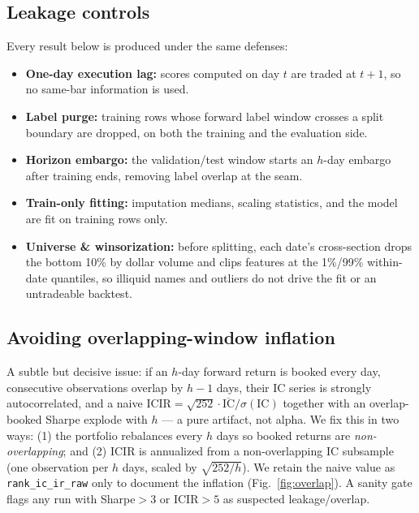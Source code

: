 \documentclass[9pt]{extarticle}
\begin{document}
\subsection{Leakage controls}
Every result below is produced under the same defenses:
\begin{itemize}
  \item \textbf{One-day execution lag:} scores computed on day $t$ are traded at
  $t{+}1$, so no same-bar information is used.
  \item \textbf{Label purge:} training rows whose forward label window crosses a
  split boundary are dropped, on both the training and the evaluation side.
  \item \textbf{Horizon embargo:} the validation/test window starts an
  $h$-day embargo after training ends, removing label overlap at the seam.
  \item \textbf{Train-only fitting:} imputation medians, scaling statistics, and
  the model are fit on training rows only.
  \item \textbf{Universe \& winsorization:} before splitting, each date's
  cross-section drops the bottom 10\% by dollar volume and clips features at the
  1\%/99\% within-date quantiles, so illiquid names and outliers do not drive the
  fit or an untradeable backtest.
\end{itemize}

\subsection{Avoiding overlapping-window inflation}
\label{sec:overlap}
A subtle but decisive issue: if an $h$-day forward return is booked every day,
consecutive observations overlap by $h{-}1$ days, their IC series is strongly
autocorrelated, and a naive
$\text{ICIR}=\sqrt{252}\cdot\overline{\text{IC}}/\sigma(\text{IC})$ together with
an overlap-booked Sharpe explode with $h$ --- a pure artifact, not alpha. We fix
this in two ways: (1) the portfolio rebalances every $h$ days so booked returns
are \emph{non-overlapping}; and (2) ICIR is annualized from a non-overlapping
IC subsample (one observation per $h$ days, scaled by $\sqrt{252/h}$). We retain
the naive value as \texttt{rank\_ic\_ir\_raw} only to document the inflation
(Fig.~\ref{fig:overlap}). A sanity gate flags any run with Sharpe$>3$ or
ICIR$>5$ as suspected leakage/overlap.
\end{document}
